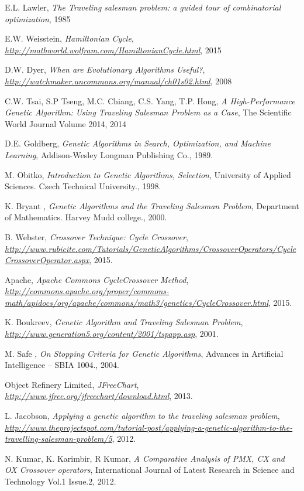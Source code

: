 \documentclass[article]{IEEEtran}
\begin{document}
\begin{thebibliography}{9}

E.L. Lawler, \textit{The Traveling salesman problem: a guided tour of combinatorial optimization},
1985

E.W. Weisstein, \textit{Hamiltonian Cycle},
\textit{\url{http://mathworld.wolfram.com/HamiltonianCycle.html}}, 2015

D.W. Dyer, \textit{When are Evolutionary Algorithms Useful?},
\textit{\url{http://watchmaker.uncommons.org/manual/ch01s02.html}}, 2008

C.W. Tsai, S.P Tseng, M.C. Chiang, C.S. Yang, T.P. Hong, \textit{A High-Performance Genetic Algorithm: Using Traveling Salesman Problem as a Case},
The Scientific World Journal Volume 2014, 2014

D.E. Goldberg, \textit{Genetic Algorithms in Search, Optimization, and Machine Learning},
Addison-Wesley Longman Publishing Co., 1989. 

M. Obitko, \textit{Introduction to Genetic Algorithms, Selection},
University of Applied Sciences. Czech Technical University., 1998. 

K. Bryant , \textit{Genetic Algorithms and the Traveling Salesman Problem},
Department of Mathematics. Harvey Mudd college., 2000. 

B. Webster, \textit{Crossover Technique: Cycle Crossover},
\textit{\url{http://www.rubicite.com/Tutorials/GeneticAlgorithms/CrossoverOperators/CycleCrossoverOperator.aspx}}, 2015.

Apache, \textit{Apache Commons CycleCrossover Method},
\textit{\url{http://commons.apache.org/proper/commons-math/apidocs/org/apache/commons/math3/genetics/CycleCrossover.html}}, 2015.

K. Boukreev, \textit{Genetic Algorithm and Traveling Salesman Problem},
\textit{\url{http://www.generation5.org/content/2001/tspapp.asp}}, 2001.

M. Safe , \textit{On Stopping Criteria for Genetic Algorithms},
Advances in Artificial Intelligence – SBIA 1004., 2004. 

Object Refinery Limited, \textit{JFreeChart},
\textit{\url{http://www.jfree.org/jfreechart/download.html}}, 2013.

L. Jacobson, \textit{Applying a genetic algorithm to the traveling salesman problem},
\textit{\url{http://www.theprojectspot.com/tutorial-post/applying-a-genetic-algorithm-to-the-travelling-salesman-problem/5}}, 2012.

N. Kumar, K. Karimbir, R Kumar, \textit{A Comparative Analysis of PMX, CX and OX Crossover operators},
International Journal of Latest Research in Science and Technology Vol.1 Issue.2, 2012.

\end{thebibliography}
\end{document}
